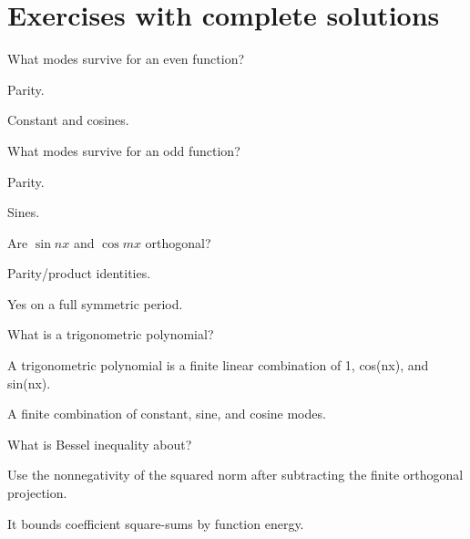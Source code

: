 \section{Exercises with complete solutions}

\begin{exercise}\label{exr:ii14-01}
What modes survive for an even function?
\end{exercise}
\begin{hint}
Parity.
\end{hint}
\begin{solution}
Constant and cosines.
\end{solution}

\begin{exercise}\label{exr:ii14-02}
What modes survive for an odd function?
\end{exercise}
\begin{hint}
Parity.
\end{hint}
\begin{solution}
Sines.
\end{solution}

\begin{exercise}\label{exr:ii14-03}
Are $\sin nx$ and $\cos mx$ orthogonal?
\end{exercise}
\begin{hint}
Parity/product identities.
\end{hint}
\begin{solution}
Yes on a full symmetric period.
\end{solution}

\begin{exercise}\label{exr:ii14-04}
What is a trigonometric polynomial?
\end{exercise}
\begin{hint}
A trigonometric polynomial is a finite linear combination of 1, cos(nx), and sin(nx).
\end{hint}
\begin{solution}
A finite combination of constant, sine, and cosine modes.
\end{solution}

\begin{exercise}\label{exr:ii14-05}
What is Bessel inequality about?
\end{exercise}
\begin{hint}
Use the nonnegativity of the squared norm after subtracting the finite orthogonal projection.
\end{hint}
\begin{solution}
It bounds coefficient square-sums by function energy.
\end{solution}

